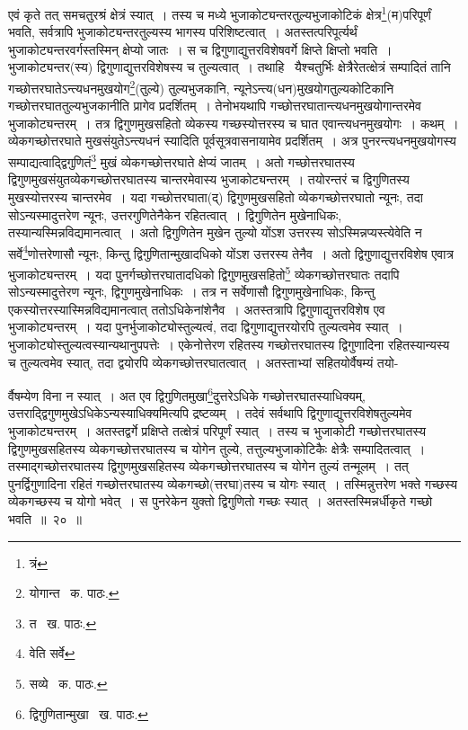 \documentclass[11pt, openany]{book}
\begin{document}
\newpage
\begin{sloppypar} 
\noindent एवं कृते तत् समचतुरश्रं क्षेत्रं स्यात्~। तस्य च मध्ये भुजाकोट्यन्तरतुल्यभुजाकोटिकं क्षेत्र\renewcommand{\thefootnote}{१}\footnote{त्रं}(म)परिपूर्णं भवति, सर्वत्रापि भुजाकोट्यन्तरतुल्यस्य भागस्य परिशिष्टत्वात्~। अतस्तत्परिपूर्त्यर्थं भुजाकोट्यन्तरवर्गस्तस्मिन् क्षेप्यो जातः~। स च द्विगुणाद्युत्तरविशेषवर्गे क्षिप्ते क्षिप्तो भवति~। भुजाकोट्यन्तर(स्य) द्विगुणाद्युत्तरविशेषस्य च तुल्यत्वात्~। तथाहि \textendash\ यैश्चतुर्भिः क्षेत्रैरेतत्क्षेत्रं सम्पादितं तानि गच्छोत्तरघातेऽन्त्यधनमुखयोग\renewcommand{\thefootnote}{२}\footnote{योगान्त \textendash\ क. पाठः.}(तुल्ये) तुल्यभुजकानि, न्यूनेऽन्त्य(धन)मुखयोगतुल्यकोटिकानि गच्छोत्तरघाततुल्यभुजकानीति प्रागेव प्रदर्शितम्~। तेनोभयथापि गच्छोत्तरघातान्त्यधनमुखयोगान्तरमेव भुजाकोट्यन्तरम्~। तत्र द्विगुणमुखसहितो व्येकस्य गच्छस्योत्तरस्य च घात एवान्त्यधनमुखयोगः~। कथम्~। व्येकगच्छोत्तरघाते मुखसंयुतेऽन्त्यधनं स्यादिति पूर्वसूत्रवासनायामेव प्रदर्शितम्~। अत्र पुनरन्त्यधनमुखयोगस्य सम्पाद्यत्वाद्द्विगुणितं\renewcommand{\thefootnote}{३}\footnote{त \textendash\ ख. पाठः.} मुखं व्येकगच्छोत्तरघाते क्षेप्यं जातम्~। अतो गच्छोत्तरघातस्य द्विगुणमुखसंयुतव्येकगच्छोत्तरघातस्य चान्तरमेवास्य भुजाकोट्यन्तरम्~। तयोरन्तरं च द्विगुणितस्य मुखस्योत्तरस्य चान्तरमेव~। यदा गच्छोत्तरघाता(द्) द्विगुणमुखसहितो व्येकगच्छोत्तरघातो न्यूनः, तदा सोऽन्यस्मादुत्तरेण न्यूनः, उत्तरगुणितेनैकेन रहितत्वात्~। द्विगुणितेन मुखेनाधिकः, तस्यान्यस्मिन्नविद्यमानत्वात्~। अतो द्विगुणितेन मुखेन तुल्यो योंऽश उत्तरस्य सोऽस्मिन्नप्यस्त्येवेति न सर्वे\renewcommand{\thefootnote}{४}\footnote{वेति सर्वे}णोत्तरेणासौ न्यूनः, किन्तु द्विगुणितान्मुखादधिको योंऽश उत्तरस्य तेनैव~। अतो द्विगुणाद्युत्तरविशेष एवात्र भुजाकोट्यन्तरम्~। यदा पुनर्गच्छोत्तरघातादधिको द्विगुणमुखसहितो\renewcommand{\thefootnote}{५}\footnote{सव्ये \textendash\ क. पाठः.} व्येकगच्छोत्तरघातः तदापि सोऽन्यस्मादुत्तेरण न्यूनः, द्विगुणमुखेनाधिकः~। तत्र न सर्वेणासौ द्विगुणमुखेनाधिकः, किन्तु एकस्योत्तरस्यास्मिन्नविद्यमानत्वात् ततोऽधिकेनांशेनैव~। अतस्तत्रापि द्विगुणाद्युत्तरविशेष एव भुजाकोट्यन्तरम्~। यदा पुनर्भुजाकोट्योस्तुल्यत्वं, तदा द्विगुणाद्युत्तरयोरपि तुल्यत्वमेव स्यात्~। भुजाकोट्योस्तुल्यत्वस्यान्यथानुपपत्तेः~। एकेनोत्तेरण रहितस्य गच्छोत्तरघातस्य द्विगुणादिना रहितस्यान्यस्य च तुल्यत्वमेव स्यात्, तदा द्वयोरपि व्येकगच्छोत्तरघातत्वात्~। अतस्ताभ्यां सहितयोर्वैषम्यं तयो-
\end{sloppypar} 
\newpage

\noindent र्वैषम्येण विना न स्यात्~। अत एव द्विगुणितमुखा\renewcommand{\thefootnote}{१}\footnote{द्विगुणितान्मुखा \textendash\ ख. पाठः.}दुत्तरेऽधिके गच्छोत्तरघातस्याधिक्यम्, उत्तराद्द्विगुणमुखेऽधिकेऽन्यस्याधिक्यमित्यपि द्रष्टव्यम्~। तदेवं सर्वथापि द्विगुणाद्युत्तरविशेषतुल्यमेव भुजाकोट्यन्तरम्~। अतस्तद्वर्गे प्रक्षिप्ते तत्क्षेत्रं परिपूर्णं स्यात्~। तस्य च भुजाकोटी गच्छोत्तरघातस्य द्विगुणमुखसहितस्य व्येकगच्छोत्तरघातस्य च योगेन तुल्ये, तत्तुल्यभुजाकोटिकैः क्षेत्रैः सम्पादितत्वात्~। तस्माद्गच्छोत्तरघातस्य द्विगुणमुखसहितस्य व्येकगच्छोत्तरघातस्य च योगेन तुल्यं तन्मूलम्~। तत् पुनर्द्विगुणादिना रहितं गच्छोत्तरघातस्य व्येकगच्छो(त्तरघा)तस्य च योगः स्यात्~। तस्मिन्नुत्तरेण भक्ते गच्छस्य व्येकगच्छस्य च योगो भवेत्~। स पुनरेकेन युक्तो द्विगुणितो गच्छः स्यात्~। अतस्तस्मिन्नर्धीकृते गच्छो भवति~॥~२०~॥\\
\end{document}
